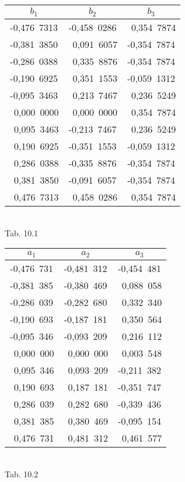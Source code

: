 {\begin{table}[!htb]
\begin{subtable}{0.5\linewidth}
  \centering
  \begin{tabular}{|c|c|c|}
    \hline
    $b_1$ & $b_2$ & $b_3$ \\
    \hline
    -0,476~7313 & -0,458~0286 & ~0,354~7874 \\ %
    -0,381~3850 & ~0,091~6057 & -0,354~7874 \\ %
    -0,286~0388 & ~0,335~8876 & -0,354~7874 \\ %
    -0,190~6925 & ~0,351~1553 & -0,059~1312 \\ %
    -0,095~3463 & ~0,213~7467 & ~0,236~5249 \\ %
    ~0,000~0000 & ~0,000~0000 & ~0,354~7874 \\ %
    ~0,095~3463 & -0,213~7467 & ~0,236~5249 \\ %
    ~0,190~6925 & -0,351~1553 & -0,059~1312 \\ %
    ~0,286~0388 & -0,335~8876 & -0,354~7874 \\ %
    ~0,381~3850 & -0,091~6057 & -0,354~7874 \\ %
    ~0,476~7313 & ~0,458~0286 & ~0,354~7874 \\ %
     \hline
  \end{tabular}\\[1.5ex]
  Tab. 10.1
\end{subtable}%
\begin{subtable}{0.5\linewidth}
  \centering
  \begin{tabular}{|c|c|c|}
    \hline
    $a_1$ & $a_2$ & $a_3$ \\
    \hline
    -0,476~731  & -0,481~312  & -0,454~481  \\ %
    -0,381~385  & -0,380~469  & ~0,088~058  \\ %
    -0,286~039  & -0,282~680  & ~0,332~340  \\ %
    -0,190~693  & -0,187~181  & ~0,350~564  \\ %
    -0,095~346  & -0,093~209  & ~0,216~112  \\ %
    ~0,000~000  & ~0,000~000  & ~0,003~548  \\ %
    ~0,095~346  & ~0,093~209  & -0,211~382  \\ %
    ~0,190~693  & ~0,187~181  & -0,351~747  \\ %
    ~0,286~039  & ~0,282~680  & -0,339~436  \\ %
    ~0,381~385  & ~0,380~469  & -0,095~154  \\ %
    ~0,476~731  & ~0,481~312  & ~0,461~577  \\ %
     \hline
  \end{tabular}\\[1.5ex]
  Tab. 10.2
\end{subtable}
\end{table}

}
